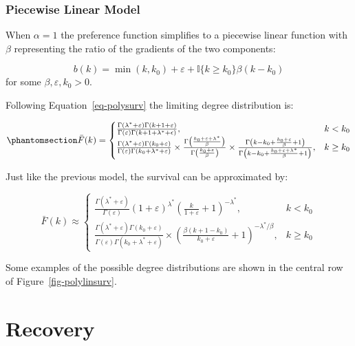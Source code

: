 \documentclass[
  sn-basic,
]{sn-jnl}
\theoremstyle{plain}
\theoremstyle{remark}
\begin{document}
\subsubsection{Piecewise Linear Model}\label{piecewise-linear-model}

When \(\alpha = 1\) the preference function simplifies to a piecewise
linear function with \(\beta\) representing the ratio of the gradients
of the two components:

\[
b(k) = \min(k,k_0) + \varepsilon + \mathbb I\{k\ge k_0\}\beta(k-k_0)
\] for some \(\beta, \varepsilon, k_0>0\).

Following Equation~\ref{eq-polysurv} the limiting degree distribution
is:

\begin{equation}\phantomsection\label{eq-linsurv}{
\bar F(k) = \begin{cases}
\frac{\Gamma(\lambda^*+\varepsilon)\Gamma(k+1+\varepsilon)}{\Gamma(\varepsilon)\Gamma(k+1+\lambda^*+\epsilon)},&k<k_0\\
\frac{\Gamma(\lambda^*+\varepsilon)\Gamma(k_0+\varepsilon)}{\Gamma(\varepsilon)\Gamma(k_0+\lambda^*+\varepsilon)}\times \frac{\Gamma\left(\frac{k_0+\varepsilon+\lambda^*}{\beta}\right)}{\Gamma\left(\frac{k_0+\varepsilon}{\beta}\right)}\times\frac{\Gamma\left(k-k_0 + \frac{k_0+\varepsilon}{\beta}+1\right)}{\Gamma\left(k-k_0 + \frac{k_0+\varepsilon+\lambda^*}{\beta}+1\right)},&k\ge k_0
\end{cases}
}\end{equation}

Just like the previous model, the survival can be approximated by:

\[
\bar F(k) \approx \begin{cases}
\frac{\Gamma(\lambda^*+\varepsilon)}{\Gamma(\varepsilon)} (1+\varepsilon)^{\lambda^*}\left(\frac{k}{1+\varepsilon} + 1\right)^{-\lambda^*},&k<k_0\\
\frac{\Gamma(\lambda^*+\varepsilon)\Gamma(k_0+\varepsilon)}{\Gamma(\varepsilon)\Gamma(k_0+\lambda^*+\varepsilon)}\times\left(\frac{\beta(k+1-k_0)}{k_0+\varepsilon} + 1\right)^{-\lambda^*/\beta},&k\ge k_0
\end{cases}
\]

Some examples of the possible degree distributions are shown in the
central row of Figure~\ref{fig-polylinsurv}.

\section{Recovery}\label{sec-rec}
\end{document}

